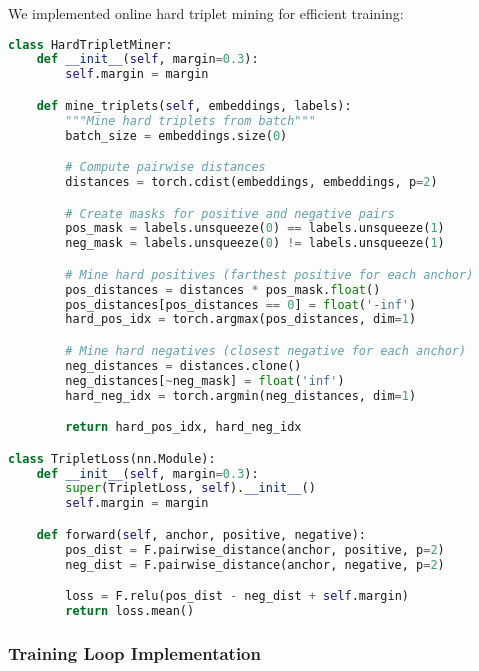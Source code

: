 We implemented online hard triplet mining for efficient training:

\begin{lstlisting}[language=Python, caption=Online Hard Triplet Mining]
class HardTripletMiner:
    def __init__(self, margin=0.3):
        self.margin = margin

    def mine_triplets(self, embeddings, labels):
        """Mine hard triplets from batch"""
        batch_size = embeddings.size(0)

        # Compute pairwise distances
        distances = torch.cdist(embeddings, embeddings, p=2)

        # Create masks for positive and negative pairs
        pos_mask = labels.unsqueeze(0) == labels.unsqueeze(1)
        neg_mask = labels.unsqueeze(0) != labels.unsqueeze(1)

        # Mine hard positives (farthest positive for each anchor)
        pos_distances = distances * pos_mask.float()
        pos_distances[pos_distances == 0] = float('-inf')
        hard_pos_idx = torch.argmax(pos_distances, dim=1)

        # Mine hard negatives (closest negative for each anchor)
        neg_distances = distances.clone()
        neg_distances[~neg_mask] = float('inf')
        hard_neg_idx = torch.argmin(neg_distances, dim=1)

        return hard_pos_idx, hard_neg_idx

class TripletLoss(nn.Module):
    def __init__(self, margin=0.3):
        super(TripletLoss, self).__init__()
        self.margin = margin

    def forward(self, anchor, positive, negative):
        pos_dist = F.pairwise_distance(anchor, positive, p=2)
        neg_dist = F.pairwise_distance(anchor, negative, p=2)

        loss = F.relu(pos_dist - neg_dist + self.margin)
        return loss.mean()
\end{lstlisting}

\subsubsection{Training Loop Implementation}

